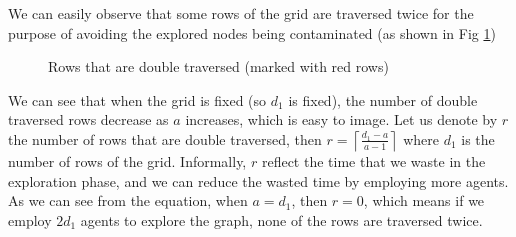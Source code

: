 We can easily observe that some rows of the grid are traversed twice for the purpose of avoiding the explored nodes being contaminated (as shown in Fig \ref{fig:doubleline})
\begin{figure} [H]
  \centering 
  \caption{Rows that are double traversed (marked with red rows)} 
  \label{fig:doubleline} %
\end{figure}
We can see that when the grid is fixed (so $d_1$ is fixed), the number of double traversed rows decrease as $a$ increases, which is easy to image. Let us denote by $r$ the number of rows that are double traversed, then $r=\left \lceil \frac{d_1-a}{a-1} \right \rceil$ where $d_1$ is the number of rows of the grid. Informally, $r$ reflect the time that we waste in the exploration phase, and we can reduce the wasted time by employing more agents. As we can see from the equation, when $a=d_1$, then $r=0$, which means if we employ $2d_1$ agents to explore the graph, none of the rows are traversed twice. \\
